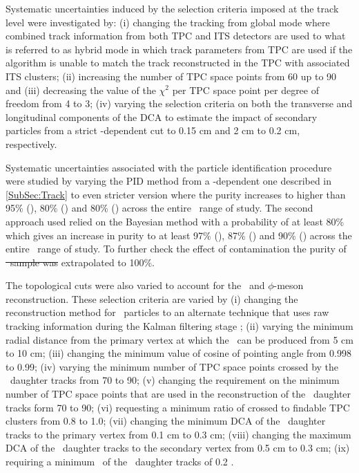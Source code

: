 \documentclass[ALICE,manyauthors]{cernphprep}
\providecommand{\DIFaddtex}[1]{{\protect\color{blue}\uwave{#1}}} %
\providecommand{\DIFdeltex}[1]{{\protect\color{red}\sout{#1}}}                      %
\providecommand{\DIFaddbegin}{} %
\providecommand{\DIFaddend}{} %
\providecommand{\DIFdelbegin}{} %
\providecommand{\DIFdelend}{} %
\providecommand{\DIFadd}[1]{\texorpdfstring{\DIFaddtex{#1}}{#1}} %
\providecommand{\DIFdel}[1]{\texorpdfstring{\DIFdeltex{#1}}{}} %
\newcommand{\DIFscaledelfig}{0.5}
\newlength{\DIFdelgraphicswidth} %
\newlength{\DIFdelgraphicsheight} %
\newcommand{\DIFaddincludegraphics}[2][]{{\color{blue}\fbox{\DIFOincludegraphics[#1]{#2}}}} %
\newcommand{\DIFdelincludegraphics}[2][]{%
\sbox{\DIFdelgraphicsbox}{\DIFOincludegraphics[#1]{#2}}%
\settoboxwidth{\DIFdelgraphicswidth}{\DIFdelgraphicsbox} %
\settoboxtotalheight{\DIFdelgraphicsheight}{\DIFdelgraphicsbox} %
\scalebox{\DIFscaledelfig}{%
\parbox[b]{\DIFdelgraphicswidth}{\usebox{\DIFdelgraphicsbox}\\[-\baselineskip] \rule{\DIFdelgraphicswidth}{0em}}\llap{\resizebox{\DIFdelgraphicswidth}{\DIFdelgraphicsheight}{%
\setlength{\unitlength}{\DIFdelgraphicswidth}%
\begin{picture}(1,1)%
\thicklines\linethickness{2pt} %
{\color[rgb]{1,0,0}\put(0,0){\framebox(1,1){}}}%
{\color[rgb]{1,0,0}\put(0,0){\line( 1,1){1}}}%
{\color[rgb]{1,0,0}\put(0,1){\line(1,-1){1}}}%
\end{picture}%
}\hspace*{3pt}}} %
} %
\DeclareRobustCommand{\DIFaddbegin}{\DIFOaddbegin \let\includegraphics\DIFaddincludegraphics} %
\DeclareRobustCommand{\DIFaddend}{\DIFOaddend \let\includegraphics\DIFOincludegraphics} %
\DeclareRobustCommand{\DIFdelbegin}{\DIFOdelbegin \let\includegraphics\DIFdelincludegraphics} %
\DeclareRobustCommand{\DIFdelend}{\DIFOaddend \let\includegraphics\DIFOincludegraphics} %
\begin{document}
Systematic uncertainties induced by the selection criteria imposed at the track level were investigated by: (i) changing the tracking from global mode where combined track information from both TPC and ITS detectors are used to what is referred to as hybrid mode in which track parameters from TPC are used if the algorithm is unable to match the track reconstructed in the TPC with associated ITS clusters; (ii) increasing the number of TPC space points from 60 up to 90 and (iii) decreasing the value of the $\chi^{2}$ per TPC space point per degree of freedom from 4 to 3; (iv) varying the selection criteria on both the transverse and longitudinal components of the DCA to estimate the impact of secondary particles from a strict \pT-dependent cut to 0.15 cm and 2 cm to 0.2 cm, respectively.



Systematic uncertainties associated with the particle identification procedure were studied by varying the PID method from a \pT-dependent one described in \ref{SubSec:Track} to even stricter version where the purity increases to higher than 95\% (\pion), 80\% (\kaon) and 80\% (\proton) across the entire \pT~range of study. The second approach used relied on the Bayesian method with a probability of at least 80\% which gives an increase in purity to at least 97\% (\pion), 87\% (\kaon) and 90\% (\proton) across the entire \pT~range of study. To further check the effect of contamination the purity of \DIFdelbegin %
\DIFdel{~sample was }\DIFdelend \DIFaddbegin \DIFadd{these species were }\DIFaddend extrapolated to 100\%. 

The topological cuts were also varied to account for the \vo~and $\phi$-meson reconstruction. These selection criteria are varied by 
(i) changing the reconstruction method for  \vo~particles to an alternate technique that uses raw tracking information during the Kalman filtering stage \DIFaddbegin \DIFadd{(referred to as online V0 finder)}\DIFaddend ; (ii) varying the minimum radial distance from the primary vertex at which the \vo~can be produced from 5 cm to 10 cm; (iii) changing the minimum value of cosine of pointing angle from 0.998 to 0.99; (iv) varying the minimum number of TPC space points crossed by the \vo~daughter tracks from 70 to 90; (v) changing the requirement on the minimum number of TPC space points that are used in the reconstruction of the \vo~daughter tracks form 70 to 90; (vi) requesting a minimum ratio of crossed to findable TPC clusters from 0.8 to 1.0; (vii) changing the minimum DCA of the \vo~daughter tracks to the primary vertex from 0.1 cm to 0.3 cm; (viii) changing the maximum DCA of the \vo~daughter tracks to the secondary vertex from 0.5 cm to 0.3 cm; (ix) requiring a minimum \pT~of the \vo~daughter tracks of 0.2 \GeV. 
\end{document}
